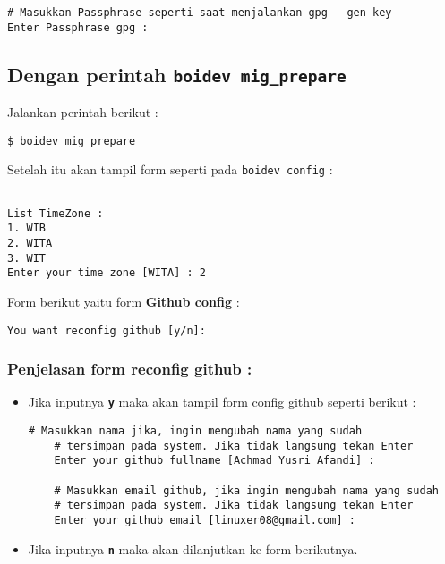 {\begin{lstlisting}[language=ShellBash]
# Masukkan Passphrase seperti saat menjalankan gpg --gen-key
Enter Passphrase gpg : 

\end{lstlisting}

\subsection{Dengan perintah \texttt{boidev mig\_prepare}}
\label{implm_2}
\noindent
Jalankan perintah berikut :

\begin{lstlisting}[language=ShellBash]
$ boidev mig_prepare
\end{lstlisting}

\noindent Setelah itu akan tampil form seperti pada \texttt{boidev config} :

\begin{lstlisting}[language=ShellBash]

List TimeZone : 
1. WIB
2. WITA
3. WIT
Enter your time zone [WITA] : 2

\end{lstlisting}

\noindent
Form berikut yaitu form \textbf{Github config} :

\begin{lstlisting}[language=ShellBash]
You want reconfig github [y/n]:
\end{lstlisting}

\subsubsection{Penjelasan form \textbf{reconfig github} :}

\begin{itemize}
	\item Jika inputnya \textbf{\texttt{y}} maka akan tampil form config github seperti berikut :
	
	\begin{lstlisting}[language=ShellBash]
	# Masukkan nama jika, ingin mengubah nama yang sudah
	# tersimpan pada system. Jika tidak langsung tekan Enter
	Enter your github fullname [Achmad Yusri Afandi] : 
	
	# Masukkan email github, jika ingin mengubah nama yang sudah
	# tersimpan pada system. Jika tidak langsung tekan Enter
	Enter your github email [linuxer08@gmail.com] : 
	\end{lstlisting}
	
	\item Jika inputnya \textbf{\texttt{n}} maka akan dilanjutkan ke form berikutnya.
\end{itemize}

}
